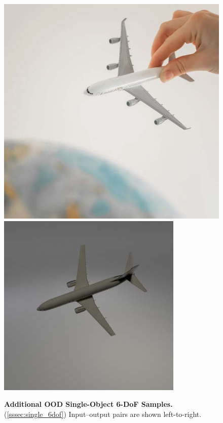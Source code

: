 \begin{figure}
\includegraphics[width=0.2475\linewidth]{figures/airplane/6dof/input/5.jpg}\hfill
\includegraphics[width=0.2475\linewidth]{figures/airplane/6dof/output/5.jpg}
\caption{\textbf{Additional OOD Single-Object 6-DoF Samples.} (\cref{sssec:single_6dof})
Input--output pairs are shown left-to-right.
}
\label{fig:single_6dof_samples_additional}
\end{figure}